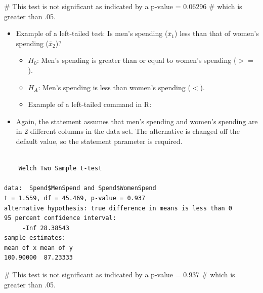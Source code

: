 \documentclass[
  letterpaper,
  DIV=11,
  numbers=noendperiod]{scrreprt}
\newenvironment{Shaded}{\begin{snugshade}}{\end{snugshade}}
\newcommand{\AttributeTok}[1]{\textcolor[rgb]{0.40,0.45,0.13}{#1}}
\newcommand{\CommentTok}[1]{\textcolor[rgb]{0.37,0.37,0.37}{#1}}
\newcommand{\FunctionTok}[1]{\textcolor[rgb]{0.28,0.35,0.67}{#1}}
\newcommand{\NormalTok}[1]{\textcolor[rgb]{0.00,0.23,0.31}{#1}}
\newcommand{\SpecialCharTok}[1]{\textcolor[rgb]{0.37,0.37,0.37}{#1}}
\newcommand{\StringTok}[1]{\textcolor[rgb]{0.13,0.47,0.30}{#1}}
\providecommand{\tightlist}{%
  \setlength{\itemsep}{0pt}\setlength{\parskip}{0pt}}\usepackage{longtable,booktabs,array}
\begin{document}
\begin{Shaded}
\begin{Highlighting}[]
\CommentTok{\# This test is not significant as indicated by a p{-}value = 0.06296}
\CommentTok{\# which is greater than .05.}
\end{Highlighting}
\end{Shaded}

\begin{itemize}
\tightlist
\item
  Example of a left-tailed test: Is men's spending (\(\bar{x}_1\)) less
  than that of women's spending (\(\bar{x}_2\))?

  \begin{itemize}
  \tightlist
  \item
    \(H_0\): Men's spending is greater than or equal to women's spending
    (\(>=\)).
  \item
    \(H_A\): Men's spending is less than women's spending (\(<\)).
  \item
    Example of a left-tailed command in R:
  \end{itemize}
\item
  Again, the statement assumes that men's spending and women's spending
  are in 2 different columns in the data set. The alternative is changed
  off the default value, so the statement parameter is required.
\end{itemize}

\begin{Shaded}
\end{Shaded}

\begin{verbatim}

    Welch Two Sample t-test

data:  Spend$MenSpend and Spend$WomenSpend
t = 1.559, df = 45.469, p-value = 0.937
alternative hypothesis: true difference in means is less than 0
95 percent confidence interval:
     -Inf 28.38543
sample estimates:
mean of x mean of y 
100.90000  87.23333 
\end{verbatim}

\begin{Shaded}
\begin{Highlighting}[]
\CommentTok{\# This test is not significant as indicated by a p{-}value = 0.937}
\CommentTok{\# which is greater than .05.}
\end{Highlighting}
\end{Shaded}
\end{document}
